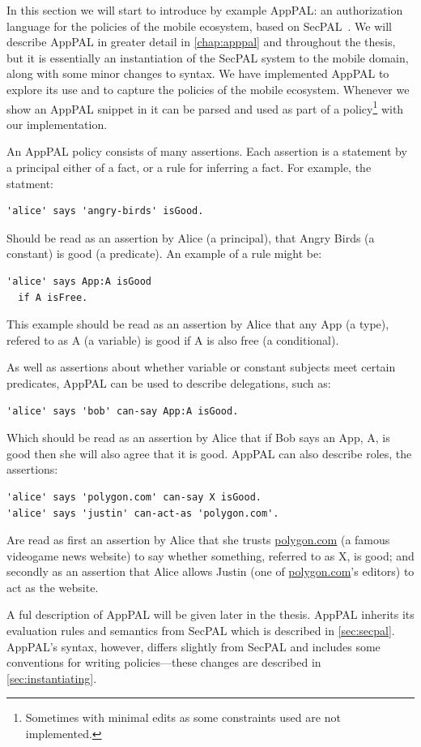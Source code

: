 \documentclass[thesis.tex]{subfiles}
\begin{document}
In this section we will start to introduce by example AppPAL: an authorization
language for the policies of the mobile ecosystem, based on
SecPAL~\cite{becker_secpal:_2006}. We will describe AppPAL in greater detail in
\autoref{chap:apppal} and throughout the thesis, but it is essentially an
instantiation of the SecPAL system to the mobile domain, along with some minor
changes to syntax. We have implemented AppPAL to explore its use and to capture
the policies of the mobile ecosystem. Whenever we show an AppPAL snippet in
 it can be parsed and used as part of a
policy\footnote{Sometimes with minimal edits as some constraints used are not
implemented.} with our implementation.

An AppPAL policy consists of many assertions.  Each assertion is a statement by
a principal either of a fact, or a rule for inferring a fact.  For example, the statment:
\begin{lstlisting}
'alice' says 'angry-birds' isGood.
\end{lstlisting}
Should be read as an assertion by Alice (a principal), that Angry Birds (a
constant) is good (a predicate).  An example of a rule might be:
\begin{lstlisting}
'alice' says App:A isGood 
  if A isFree.
\end{lstlisting}
This example should be read as an assertion by Alice that any App (a type),
refered to as A (a variable) is good if A is also free (a conditional).   

As well as assertions about whether variable or constant subjects meet certain
predicates, AppPAL can be used to describe delegations, such as:
\begin{lstlisting}
'alice' says 'bob' can-say App:A isGood.
\end{lstlisting}
Which should be read as an assertion by Alice that if Bob says an App, A, is
good then she will also agree that it is good.  AppPAL can also describe roles,
the assertions:
\begin{lstlisting}
'alice' says 'polygon.com' can-say X isGood.
'alice' says 'justin' can-act-as 'polygon.com'.
\end{lstlisting}
Are read as first an assertion by Alice that she trusts \url{polygon.com} (a
famous videogame news website) to say whether something, referred to as X, is
good; and secondly as an assertion that Alice allows Justin (one of
\url{polygon.com}'s editors) to act as the website.  

A ful description of AppPAL will be given later in the thesis.  
AppPAL inherits its evaluation rules and semantics from SecPAL which is described in
\autoref{sec:secpal}.  AppPAL's syntax, however, differs slightly
from SecPAL and includes some conventions for writing policies---these changes
are described in \autoref{sec:instantiating}.
\end{document}
